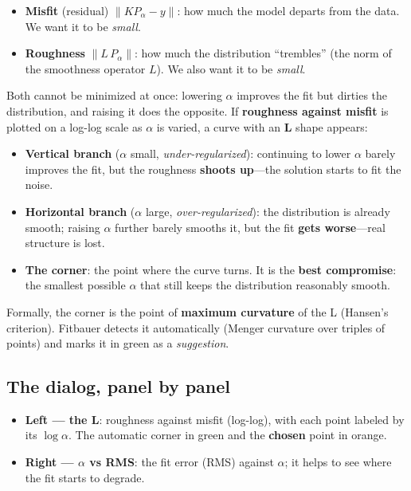 \begin{itemize}[nosep]
  \item \textbf{Misfit} (residual) $\lVert K P_\alpha - y\rVert$: how much the model
        departs from the data. We want it to be \emph{small}.
  \item \textbf{Roughness} $\lVert L\,P_\alpha\rVert$: how much the distribution
        ``trembles'' (the norm of the smoothness operator $L$). We also want it to be
        \emph{small}.
\end{itemize}

Both cannot be minimized at once: lowering $\alpha$ improves the fit but dirties the
distribution, and raising it does the opposite. If \textbf{roughness against misfit}
is plotted on a log-log scale as $\alpha$ is varied, a curve with an \textbf{L}
shape appears:

\begin{itemize}[nosep]
  \item \textbf{Vertical branch} ($\alpha$ small, \emph{under-regularized}):
        continuing to lower $\alpha$ barely improves the fit, but the roughness
        \textbf{shoots up}---the solution starts to fit the noise.
  \item \textbf{Horizontal branch} ($\alpha$ large, \emph{over-regularized}): the
        distribution is already smooth; raising $\alpha$ further barely smooths it,
        but the fit \textbf{gets worse}---real structure is lost.
  \item \textbf{The corner}: the point where the curve turns. It is the \textbf{best
        compromise}: the smallest possible $\alpha$ that still keeps the distribution
        reasonably smooth.
\end{itemize}

Formally, the corner is the point of \textbf{maximum curvature} of the L (Hansen's
criterion). Fitbauer detects it automatically (Menger curvature over triples of
points) and marks it in \textcolor{fbgreen}{green} as a \emph{suggestion}.

\subsection{The dialog, panel by panel}

\begin{itemize}[nosep]
  \item \textbf{Left --- the L}: roughness against misfit (log-log), with each point
        labeled by its $\log\alpha$. The automatic corner in green and the
        \textbf{chosen} point in \textcolor{fbred}{orange}.
  \item \textbf{Right --- $\alpha$ vs RMS}: the fit error (RMS) against $\alpha$;
        it helps to see where the fit starts to degrade.
\end{itemize}

